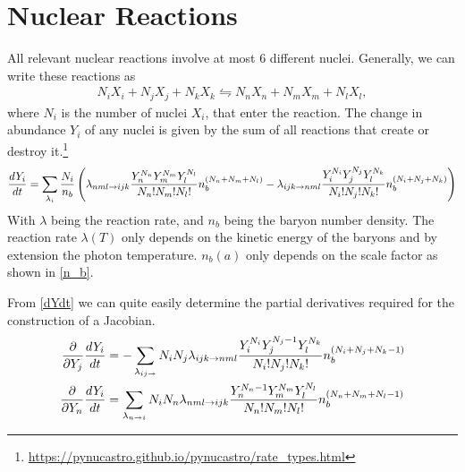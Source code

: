 %
%
\section{Nuclear Reactions}
\label{sec:nucleartheory}

All relevant nuclear reactions involve at most 6 different nuclei. Generally, we can write these reactions as
\begin{align}
    N_i X_i + N_j X_j + N_k X_k \leftrightharpoons N_n X_n + N_m X_m + N_l X_l ,
\end{align}
where $N_i$ is the number of nuclei $X_i$, that enter the reaction. 
The change in abundance $Y_i$ of any nuclei is given by the sum of all reactions that create or destroy it.\footnote{\url{https://pynucastro.github.io/pynucastro/rate_types.html}}
\begin{align}
    \frac{dY_i}{dt}=\sum_{\lambda_i}\frac{N_i}{n_b}\left(\lambda_{n m l \rightarrow i j k} \frac{Y_n^{N_n}Y_m^{N_m}Y_l^{N_l}}{N_n!N_m!N_l!}n_b^{(N_n+N_m+N_l)}-\lambda_{i j k \rightarrow n m l}\frac{Y_i^{N_i}Y_j^{N_j}Y_l^{N_k}}{N_i!N_j!N_k!}n_b^{(N_i+N_j+N_k)}\right)
    \label{dYdt}
\end{align}
With $\lambda$ being the reaction rate, and $n_b$ being the baryon number density. The reaction rate $\lambda(T)$ only depends on the kinetic energy of the baryons and by extension the photon temperature. $n_b(a)$ only depends on the scale factor as shown in \eqref{n_b}. 

From \eqref{dYdt} we can quite easily determine the partial derivatives required for the construction of a Jacobian. 
\begin{align}
    \frac{\partial }{\partial Y_j}\frac{dY_i}{dt}&=-\sum_{\lambda_{ij\rightarrow}}N_i N_j\lambda_{i j k \rightarrow n m l}\frac{Y_i^{N_i}Y_j^{N_j-1}Y_l^{N_k}}{N_i!N_j!N_k!}n_b^{(N_i+N_j+N_k-1)}\label{eq:jacterms1}\\
    \frac{\partial }{\partial Y_n}\frac{dY_i}{dt}&=\sum_{\lambda_{n \rightarrow i }}N_i N_n\lambda_{n m l \rightarrow i j k} \frac{Y_n^{N_n-1}Y_m^{N_m}Y_l^{N_l}}{N_n!N_m!N_l!}n_b^{(N_n+N_m+N_l-1)}
    \label{eq:jacterms2}
\end{align}


